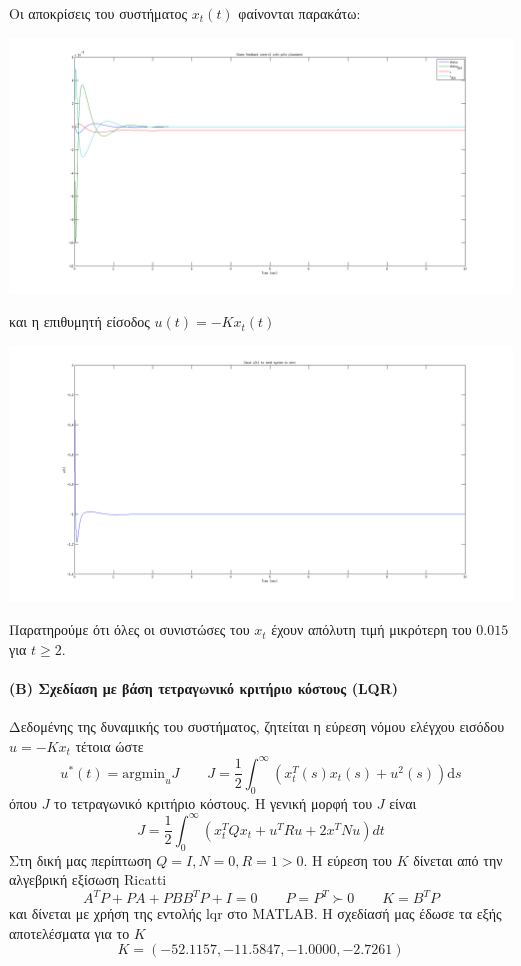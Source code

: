 \documentclass[a4paper,oneside, 12pt]{article}
\begin{document}
Οι αποκρίσεις του συστήματος $x_t(t)$ φαίνονται παρακάτω: 

\includegraphics[width=\textwidth]{A.png}

και η επιθυμητή είσοδος $u(t) = -K x_t(t)$

\includegraphics[width=\textwidth]{input_sf.png}


Παρατηρούμε ότι όλες οι συνιστώσες του $x_t$ έχουν απόλυτη τιμή μικρότερη του $0.015$ για $t \ge 2$.  

\paragraph{(Β) Σχεδίαση με βάση τετραγωνικό κριτήριο κόστους (LQR)} Δεδομένης της δυναμικής του συστήματος, ζητείται η εύρεση νόμου ελέγχου εισόδου $u = -Kx_t$ τέτοια ώστε $$u^*(t) = \mathrm {argmin}_u J \qquad J = \frac 1 2 \int_{0}^\infty (x_t^T (s) x_t(s) + u^2(s) ) \mathrm d s $$ όπου $J$ το τετραγωνικό κριτήριο κόστους. Η γενική μορφή του $J$ είναι $$J = \frac 1 2 \int_0^\infty (x_t^T Q x_t + u^T R u + 2x^T N u) dt$$Στη δική μας περίπτωση $Q = I, N = 0, R = 1 > 0 $. Η εύρεση του $K$ δίνεται από την αλγεβρική εξίσωση Ricatti $$A^T P + PA + PBB^TP + I = 0 \qquad P = P^T \succ 0 \qquad  K = B^T P$$ και δίνεται με χρήση της εντολής lqr στο MATLAB. Η σχεδίασή μας έδωσε τα εξής αποτελέσματα για το $K$ 
$$K =(-52.1157,  -11.5847,  -1.0000,   -2.7261)$$ 
\end{document}
